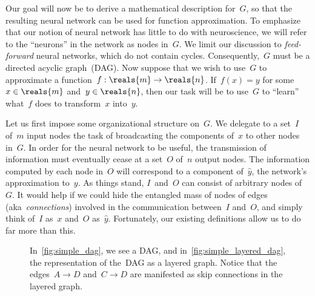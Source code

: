 \documentclass[11pt,a4paper]{article}
\numberwithin{equation}{section}
\begin{document}
Our goal will now be to derive a mathematical description for~$G$, so that the
resulting neural network can be used for function approximation. To emphasize
that our notion of neural network has little to do with neuroscience, we will
refer to the ``neurons'' in the network as nodes in~$G$. We limit our discussion
to \emph{feed-forward} neural networks, which do not contain cycles.
Consequently,~$G$ must be a directed acyclic graph~(DAG). Now suppose that we
wish to use~$G$ to approximate a function~$f: \reals{m} \to \reals{n}$. If~$f(x)
= y$ for some~$x \in \reals{m}$ and~$y \in \reals{n}$, then our task will be to
use~$G$ to ``learn'' what~$f$ does to transform~$x$ into~$y$.

Let us first impose some organizational structure on~$G$. We delegate to a
set~$I$ of~$m$ input nodes the task of broadcasting the components of~$x$ to
other nodes in~$G$. In order for the neural network to be useful, the
transmission of information must eventually cease at a set~$O$ of~$n$ output
nodes. The information computed by each node in~$O$ will correspond to a
component of~$\hat{y}$, the network's approximation to~$y$. As things stand,
$I$~and~$O$ can consist of arbitrary nodes of~$G$. It would help if we could
hide the entangled mass of nodes of edges (aka~\emph{connections}) involved in
the communication between~$I$ and~$O$, and simply think of~$I$ as~$x$ and~$O$
as~$\hat{y}$.  Fortunately, our existing definitions allow us to do far more
than this.

\begin{figure}
\centering
\begin{minipage}[t]{0.4\linewidth}
	\centering
	\subcaption{}\label{fig:simple_dag}
\end{minipage}
\begin{minipage}[t]{0.4\linewidth}
	\centering
	\subcaption{}\label{fig:simple_layered_dag}
\end{minipage}
\caption{In~\ref{fig:simple_dag}, we see a DAG, and
in~\ref{fig:simple_layered_dag}, the representation of the~DAG as a layered
graph. Notice that the edges~$A \rightarrow D$ and~$C \rightarrow D$ are
manifested as skip connections in the layered
graph.\label{fig:layered_graph_drawing}}
\end{figure}
\end{document}

